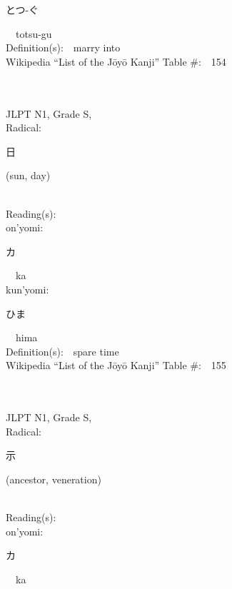 \begin{multicols}{2}
{\hspace*{2em}}{\begin{CJK}{UTF8}{min} とつ-ぐ \end{CJK}}\ \ totsu-gu\ \ \\
Definition(s):\ \ marry into \\
Wikipedia ``List of the J\=oy\=o Kanji'' Table \#:\ \ 154 \\
\ \ \\
{\fontsize{34pt}{40pt}  }\ \ \\
{JLPT N1, Grade S, \\Radical:\ \ {\begin{CJK}{UTF8}{min} 日 \end{CJK}} (sun, day) } \\
Reading(s):\ \ \\
{\hspace*{1em}}on'yomi:\ \ \\
{\hspace*{2em}}{\begin{CJK}{UTF8}{min} カ \end{CJK}}\ \ ka\ \ \\
{\hspace*{1em}}kun'yomi:\ \ \\
{\hspace*{2em}}{\begin{CJK}{UTF8}{min} ひま \end{CJK}}\ \ hima\ \ \\
Definition(s):\ \ spare time \\
Wikipedia ``List of the J\=oy\=o Kanji'' Table \#:\ \ 155 \\
\ \ \\
{\fontsize{34pt}{40pt}  }\ \ \\
{JLPT N1, Grade S, \\Radical:\ \ {\begin{CJK}{UTF8}{min} 示 \end{CJK}} (ancestor, veneration) } \\
Reading(s):\ \ \\
{\hspace*{1em}}on'yomi:\ \ \\
{\hspace*{2em}}{\begin{CJK}{UTF8}{min} カ \end{CJK}}\ \ ka\ \ \\

\end{multicols}
